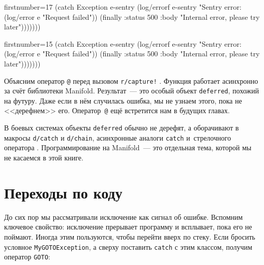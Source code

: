 \wavetop

\ifx\DEVICETYPE\MOBILE

\begin{english}
  \begin{clojure/lines*}{firstnumber=17}
(catch Exception e-sentry
  (log/errorf e-sentry
    "Sentry error: %
  (log/error e "Request failed"))
(finally
  {:status 500
   :body  "Internal error, please try
   later"})))))))
  \end{clojure/lines*}
\end{english}

\else

\begin{english}
  \begin{clojure/lines*}{firstnumber=15}
            (catch Exception e-sentry
              (log/errorf e-sentry "Sentry error: %
              (log/error e "Request failed"))
            (finally
              {:status 500
               :body "Internal error, please try later"})))))))
  \end{clojure/lines*}
\end{english}

\fi


\mnoindent
Объясним оператор \verb|@| перед вызовом \verb|r/capture!| \ifx\DEVICETYPE\MOBILE{}\else{}\fi. Функция
работает асинхронно за счёт библиотеки Manifold. Результат~--- это особый
объект \verb|deferred|, похожий на футуру. Даже если в нём случилась ошибка, мы
не узнаем этого, пока не <<дерефнем>> его. Оператор~\verb|@| ещё встретится нам
в будущих главах.

В боевых системах объекты \verb|deferred| обычно не дерефят, а оборачивают в
макросы \verb|d/catch| и \verb|d/chain|, асинхронные аналоги \verb|catch|
и~стрелочного оператора \arr{}. Программирование на Manifold~--- это
отдельная тема, которой мы не касаемся в этой книге.

\section{Переходы по коду}


До сих пор мы рассматривали исключение как сигнал об ошибке. Вспомним ключевое
свойство: исключение прерывает программу и всплывает, пока его не
поймают. Иногда этим пользуются, чтобы перейти вверх по стеку. Если бросить
условное \verb|MyGOTOException|, а сверху поставить \verb|catch| с этим
классом, получим оператор \verb|GOTO|:

